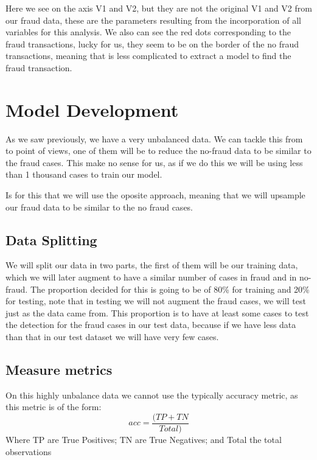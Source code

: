 \documentclass[
]{article}
\begin{document}
Here we see on the axis V1 and V2, but they are not the original V1 and
V2 from our fraud data, these are the parameters resulting from the
incorporation of all variables for this analysis. We also can see the
red dots corresponding to the fraud transactions, lucky for us, they
seem to be on the border of the no fraud transactions, meaning that is
less complicated to extract a model to find the fraud transaction.

\newpage

\hypertarget{model-development}{%
\section{Model Development}\label{model-development}}

As we saw previously, we have a very unbalanced data. We can tackle this
from to point of views, one of them will be to reduce the no-fraud data
to be similar to the fraud cases. This make no sense for us, as if we do
this we will be using less than 1 thousand cases to train our model.

Is for this that we will use the oposite approach, meaning that we will
upsample our fraud data to be similar to the no fraud cases.

\hypertarget{data-splitting}{%
\subsection{Data Splitting}\label{data-splitting}}

We will split our data in two parts, the first of them will be our
training data, which we will later augment to have a similar number of
cases in fraud and in no-fraud. The proportion decided for this is going
to be of 80\% for training and 20\% for testing, note that in testing we
will not augment the fraud cases, we will test just as the data came
from. This proportion is to have at least some cases to test the
detection for the fraud cases in our test data, because if we have less
data than that in our test dataset we will have very few cases.

\hypertarget{measure-metrics}{%
\subsection{Measure metrics}\label{measure-metrics}}

On this highly unbalance data we cannot use the typically accuracy
metric, as this metric is of the form: \[acc = \frac{(TP + TN}{Total)}\]
Where TP are True Positives; TN are True Negatives; and Total the total
observations
\end{document}
